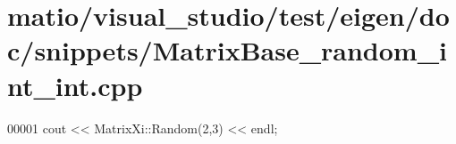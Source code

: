\hypertarget{matio_2visual__studio_2test_2eigen_2doc_2snippets_2_matrix_base__random__int__int_8cpp_source}{}\section{matio/visual\+\_\+studio/test/eigen/doc/snippets/\+Matrix\+Base\+\_\+random\+\_\+int\+\_\+int.cpp}
\label{matio_2visual__studio_2test_2eigen_2doc_2snippets_2_matrix_base__random__int__int_8cpp_source}

\begin{DoxyCode}
00001 cout << MatrixXi::Random(2,3) << endl;
\end{DoxyCode}
